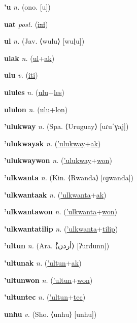 \textbf{\hypertarget{'u}{'u}} \textit{n.} (ono. [u])


\textbf{\hypertarget{uat}{uat}} \textit{post.} (\hyperlink{ial}{\sout{ial}})


\textbf{\hypertarget{ul}{ul}} \textit{n.} (Jav. ⟨wulu⟩ [wuɭu])


\textbf{\hypertarget{ulak}{ulak}} \textit{n.} (\hyperlink{ul}{ul}+\allowbreak \hyperlink{ak}{ak})


\textbf{\hypertarget{ulu}{ulu}} \textit{v.} (\hyperlink{iti}{\sout{iti}})


\textbf{\hypertarget{ulules}{ulules}} \textit{n.} (\hyperlink{ulu}{ulu}+\allowbreak \hyperlink{les}{les})


\textbf{\hypertarget{ululon}{ululon}} \textit{n.} (\hyperlink{ulu}{ulu}+\allowbreak \hyperlink{lon}{lon})


\textbf{\hypertarget{'ulukway}{'ulukway}} \textit{n.} (Spa. ⟨Uruguay⟩ [uɾuˈɣaj])


\textbf{\hypertarget{'ulukwayak}{'ulukwayak}} \textit{n.} (\hyperlink{'ulukway}{'ulukway}+\allowbreak \hyperlink{ak}{ak})


\textbf{\hypertarget{'ulukwaywon}{'ulukwaywon}} \textit{n.} (\hyperlink{'ulukway}{'ulukway}+\allowbreak \hyperlink{won}{won})


\textbf{\hypertarget{'ulkwanta}{'ulkwanta}} \textit{n.} (Kin. ⟨Rwanda⟩ [ɾɡwanda])


\textbf{\hypertarget{'ulkwantaak}{'ulkwantaak}} \textit{n.} (\hyperlink{'ulkwanta}{'ulkwanta}+\allowbreak \hyperlink{ak}{ak})


\textbf{\hypertarget{'ulkwantawon}{'ulkwantawon}} \textit{n.} (\hyperlink{'ulkwanta}{'ulkwanta}+\allowbreak \hyperlink{won}{won})


\textbf{\hypertarget{'ulkwantatilip}{'ulkwantatilip}} \textit{n.} (\hyperlink{'ulkwanta}{'ulkwanta}+\allowbreak \hyperlink{tilip}{tilip})


\textbf{\hypertarget{'ultun}{'ultun}} \textit{n.} (Ara. ⟨{\arabics{}ْأردن}⟩ [ʔurdunn])


\textbf{\hypertarget{'ultunak}{'ultunak}} \textit{n.} (\hyperlink{'ultun}{'ultun}+\allowbreak \hyperlink{ak}{ak})


\textbf{\hypertarget{'ultunwon}{'ultunwon}} \textit{n.} (\hyperlink{'ultun}{'ultun}+\allowbreak \hyperlink{won}{won})


\textbf{\hypertarget{'ultuntec}{'ultuntec}} \textit{n.} (\hyperlink{'ultun}{'ultun}+\allowbreak \hyperlink{tec}{tec})


\textbf{\hypertarget{unhu}{unhu}} \textit{v.} (Sho. ⟨unhu⟩ [unhu])


